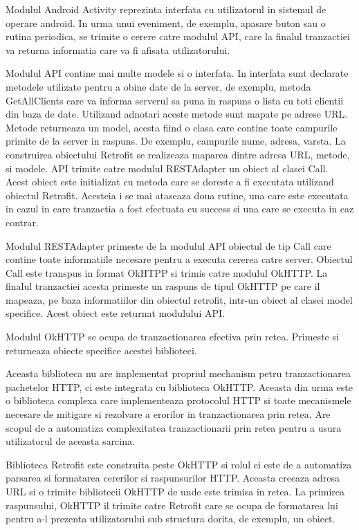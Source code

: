Modulul Android Activity reprezinta interfata cu utilizatorul in sistemul de operare android. In urma unui eveniment, de exemplu, apasare buton sau 
o rutina periodica, se trimite o cerere catre modulul API, care la finalul tranzactiei va returna informatia care va fi afisata utilizatorului.

Modulul API contine mai multe modele si o interfata. In interfata sunt declarate metodele utilizate pentru a obine date de la server, de exemplu, metoda 
GetAllClients care va informa serverul sa puna in raspuns o lista cu toti clientii din baza de date. Utilizand adnotari aceste metode sunt mapate pe adrese URL. 
Metode returneaza un model, acesta fiind o clasa care contine toate campurile primite de la server in raspuns. De exemplu, campurile nume, adresa, 
varsta. La construirea obiectului Retrofit se realizeaza maparea dintre adresa URL, metode, si modele. API trimite catre modulul RESTAdapter un obiect 
al clasei Call. Acest obiect este initializat cu metoda care se doreste a fi executata utilizand obiectul Retrofit. Acesteia i se mai ataseaza 
doua rutine, una care este executata in cazul in care tranzactia a fost efectuata cu success si una care se executa in caz 
contrar.

Modulul RESTAdapter primeste de la modulul API obiectul de tip Call care contine toate informatiile necesare pentru a executa cererea catre server. Obiectul Call 
este transpus in format OkHTPP si trimis catre modulul OkHTTP. La finalul tranzactiei acesta primeste un raspuns de tipul OkHTTP pe care il mapeaza, 
pe baza informatiilor din obiectul retrofit, intr-un obiect al clasei model specifice. Acest obiect este returnat modulului API.

Modulul OkHTTP se ocupa de tranzactionarea efectiva prin retea. Primeste si returneaza obiecte specifice acestei biblioteci.

Aceasta biblioteca nu are implementat propriul mechanism petru tranzactionarea pachetelor HTTP, ci este integrata cu biblioteca OkHTTP. Aceasta din 
urma este o biblioteca complexa care implementeaza protocolul HTTP si toate mecanismele necesare de mitigare si rezolvare a erorilor in tranzactionarea 
prin retea. Are scopul de a automatiza complexitatea tranzactionarii prin retea pentru a usura utilizatorul de aceasta sarcina.

Biblioteca Retrofit este construita peste OkHTTP si rolul ei este de a automatiza parsarea si formatarea cererilor si raspunsurilor HTTP. Aceasta creeaza 
adresa URL si o trimite bibliotecii OkHTTP de unde este trimisa in retea. La primirea raspunsului, OkHTTP il trimite catre Retrofit care se ocupa de formatarea 
lui pentru a-l prezenta utilizatorului sub structura dorita, de exemplu, un obiect.

